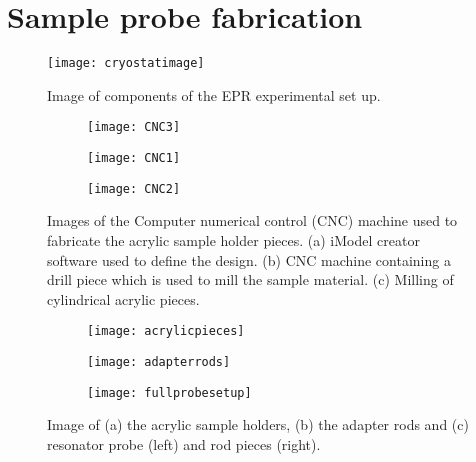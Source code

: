 \chapter{\label{sec:sampleprobefabrication}Sample probe fabrication}

\begin{figure}[h]
\centering
\texttt{[image: cryostatimage]}
\caption{\label{fig:experimentalsetup} Image of components of the EPR experimental set up.}
\end{figure}


\begin{figure}[H]
    \centering
    \begin{subfigure}[b]{0.4\textwidth}
        \centering
        \texttt{[image: CNC3]}
        \caption{}
    \end{subfigure}
    \begin{subfigure}[b]{0.4\textwidth}
        \centering
        \texttt{[image: CNC1]}
   \caption{}
   \end{subfigure}
       \begin{subfigure}[b]{0.4\textwidth}
        \centering
        \texttt{[image: CNC2]}
   \caption{}
   \end{subfigure}
   \caption{Images of the Computer numerical control (CNC) machine used to fabricate the acrylic sample holder pieces. (a) iModel creator software used to define the design. (b) CNC machine containing a drill piece which is used to mill the sample material. (c) Milling of cylindrical acrylic pieces.}
\end{figure}


\begin{figure}[H]
    \centering
    \begin{subfigure}[b]{0.35\textwidth}
        \centering
        \texttt{[image: acrylicpieces]}
        \caption{}
    \end{subfigure}
    \begin{subfigure}[b]{0.3\textwidth}
        \centering
        \texttt{[image: adapterrods]}
   \caption{}
   \end{subfigure}
       \begin{subfigure}[b]{0.2\textwidth}
        \centering
        \texttt{[image: fullprobesetup]}
   \caption{}
   \end{subfigure}
   \caption{Image of (a) the acrylic sample holders, (b) the adapter rods and (c) resonator probe (left) and rod pieces (right).}
\end{figure}


